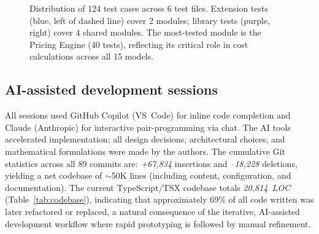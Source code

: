 \documentclass[a4paper,fleqn]{cas-dc}
\begin{document}
\begin{figure}[htp!]
\caption{Distribution of 124 test cases across 6 test files. Extension tests (blue, left of dashed line) cover 2 modules; library tests (purple, right) cover 4 shared modules. The most-tested module is the Pricing Engine (40 tests), reflecting its critical role in cost calculations across all 15 models.}
\label{fig:testdist}
\end{figure}


\subsection{AI-assisted development sessions}


All sessions used GitHub Copilot (VS~Code) for inline code completion and Claude (Anthropic) for interactive pair-programming via chat. The AI tools accelerated implementation; all design decisions, architectural choices, and mathematical formulations were made by the authors. The cumulative Git statistics across all 89 commits are: \textit{+67,834} insertions and \textit{--18,228} deletions, yielding a net codebase of $\sim$50K lines (including content, configuration, and documentation). The current TypeScript/TSX codebase totals \textit{20,814~LOC} (Table~\ref{tab:codebase}), indicating that approximately 69\% of all code written was later refactored or replaced, a natural consequence of the iterative, AI-assisted development workflow where rapid prototyping is followed by manual refinement.




\printcredits




\end{document}

